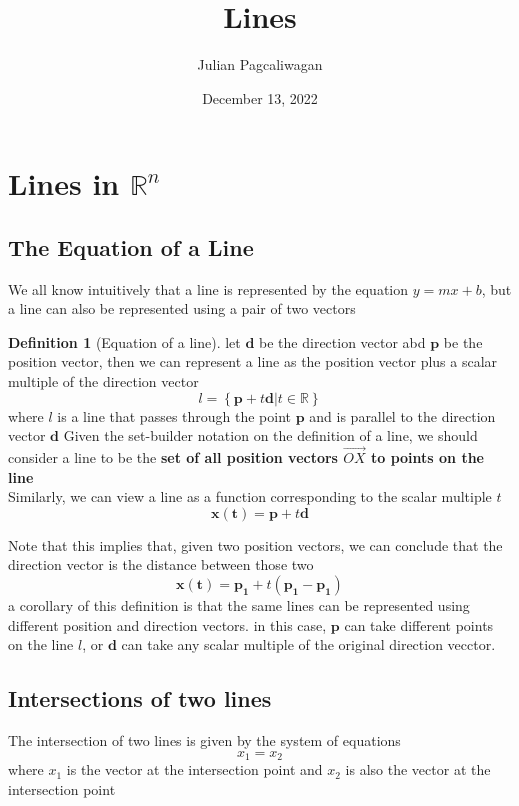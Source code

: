 \documentclass{report}
\title{Lines}
\author{Julian Pagcaliwagan}
\date{December 13, 2022}
\theoremstyle{definition}
\newtheorem{definition}{Definition}
\begin{document}
\maketitle
\section*{Lines in $ \mathbb{R}^n $}
    \subsection*{The Equation of a Line}
        \noindent We all know intuitively that a line is represented by the equation $ y = mx + b $, but a line can also be represented using a pair of two vectors
        \begin{definition}[Equation of a line]
            let $ \mathbf{d}$ be the direction vector abd $ \mathbf{p} $ be the position vector, then we can represent a line as 
            the position vector plus a scalar multiple of the direction vector
            \[
                l = \left\{ \mathbf{p} + t \mathbf{d} | t \in\mathbb{R} \right\}
            \]
            where $ l $ is a line that passes through the point $ \mathbf{p} $ and is parallel to the direction vector $ \mathbf{d} $
            Given the set-builder notation on the definition of a line, we should consider a line to be the \textbf{set of all position vectors $ \overrightarrow{OX}$ to points on the line}\\
            Similarly, we can view a line as a function corresponding to the scalar multiple $ t $
            \[
                \mathbf{x(t)} = \mathbf{p} + t \mathbf{d}
            \]
        
            \noindent Note that this implies that, given two position vectors, we can conclude that the direction vector is the distance between those two
            \[
                \mathbf{x(t)} = \mathbf{ \mathbf{p_1}} + t ( \mathbf{ \mathbf{p_1}} - \mathbf{ \mathbf{p_1}})
            \]
            \noindent a corollary of this definition is that the same lines can be represented using different position and direction vectors. in this case, $ \mathbf{p} $ can take different points on the line $ l $, or $ \mathbf{d} $ can take any scalar multiple of the original direction vecctor.

        \end{definition}
    \subsection*{Intersections of two lines}
        The intersection of two lines is given by the system of equations
        \[
            x_1 = x_2
        \]
        where $ x_1 $ is the vector at the intersection point and $ x_2 $ is also the vector at the intersection point
\end{document}

